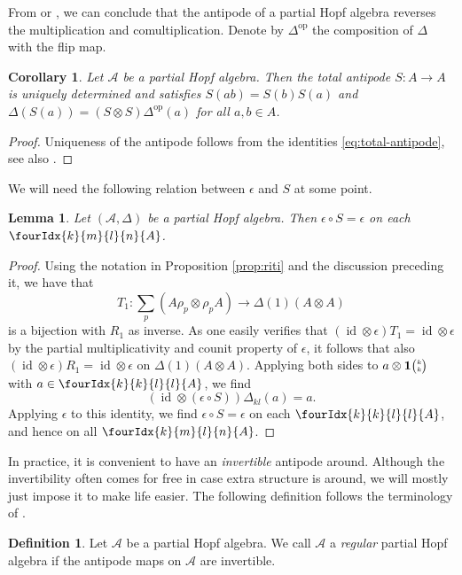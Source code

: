 \documentclass[11pt]{article}
\DeclareMathOperator{\id}{id}
\DeclareMathOperator{\op}{\mathrm{op}}
\newcommand{\Grt}[3]{#1{\tiny {\begin{pmatrix} #2\\#3\end{pmatrix}}}}
\newcommand{\UnitC}[2]{\Grt{\mathbf{1}}{#1}{#2}}
\newcommand{\Gr}[5]{\fourIdx{#2}{#4}{#3}{#5}{#1}}%
\newtheorem{Lem}[Theorem]{Lemma}
\newtheorem{Cor}[Theorem]{Corollary}
\theoremstyle{definition}
\newtheorem{Def}[Theorem]{Definition}
\numberwithin{equation}{section}
\begin{document}
From \cite[Proposition 3.5 and Proposition 3.7]{VDW1} or \cite[Theorem
6.12 and Corollary 6.16]{Boh1}, we can conclude that the antipode of a
partial Hopf algebra reverses the multiplication and
comultiplication. Denote by $\Delta^{\op}$ the composition of
$\Delta$ with the flip map.

\begin{Cor} \label{corollary:antipode} Let $\mathscr{A}$ be a partial
  Hopf algebra. Then the total antipode $S:A\rightarrow A$ is uniquely determined and satisfies
  $S(ab) = S(b)S(a)$ and $\Delta(S(a)) = (S\otimes S)\Delta^{\op}(a)$
  for all $a,b\in A$.
\end{Cor} 
\begin{proof} Uniqueness of the antipode follows from the identities \eqref{eq:total-antipode}, see also \cite[Remark 2.8.(ii)]{VDW1}. 
\end{proof} 

We will need the following relation between $\epsilon$ and $S$ at some point.

\begin{Lem}\label{LemCoAnt} Let $(\mathscr{A},\Delta)$ be a partial Hopf algebra. Then $\epsilon\circ S = \epsilon$ on each $\Gr{A}{k}{l}{m}{n}$.
\end{Lem}

\begin{proof} Using the notation in Proposition \ref{prop:riti} and the discussion preceding it, we have that \[T_1: \sum_p(A\rho_p\otimes \rho_p A)\rightarrow \Delta(1)(A\otimes A)\] is a bijection with $R_1$ as inverse. As one easily verifies that $(\id\otimes \epsilon)T_1 = \id\otimes \epsilon$ by the partial multiplicativity and counit property of $\epsilon$, it follows that also $(\id\otimes \epsilon)R_1 = \id\otimes \epsilon$ on $\Delta(1)(A\otimes A)$. Applying both sides to $a\otimes \UnitC{k}{k}$ with $a\in \Gr{A}{k}{l}{k}{l}$, we find \[(\id\otimes (\epsilon\circ S))\Delta_{kl}(a) = a.\] Applying $\epsilon$ to this identity, we find $\epsilon\circ S = \epsilon$ on each $\Gr{A}{k}{l}{k}{l}$, and hence on all $\Gr{A}{k}{l}{m}{n}$.
\end{proof} 


In practice, it is convenient to have an \emph{invertible} antipode around. Although the invertibility often comes for free in case extra structure is around, we will mostly just impose it to make life easier. The following definition follows the terminology of \cite{VDae1}. 

\begin{Def} Let $\mathscr{A}$ be a partial Hopf algebra. We call $\mathscr{A}$ a \emph{regular} partial Hopf algebra if the antipode maps on $\mathscr{A}$ are invertible.
\end{Def}
\end{document}

